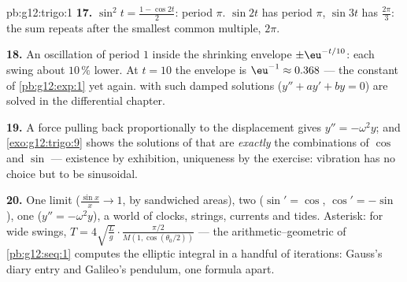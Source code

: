 \begin{solution}{pb:g12:trigo:1}
\textbf{17.} $\sin^2 t = \frac{1 - \cos 2t}{2}$: period
$\pi$. $\sin 2t$ has period $\pi$, $\sin 3t$ has
$\frac{2\pi}{3}$: the sum repeats after the smallest common
multiple, $2\pi$.

\textbf{18.} An oscillation of period $1$ inside the shrinking
envelope $\pm\eu^{-t/10}$: each swing about $10\,\%$ lower. At
$t = 10$ the envelope is $\eu^{-1} \approx 0.368$ --- the
constant of \cref{pb:g12:exp:1} yet again.  with such
damped solutions ($y'' + a y' + b y = 0$) are solved in the
differential  chapter.

\textbf{19.} A force pulling back proportionally to the
displacement gives $y'' = -\omega^2 y$; and
\cref{exo:g12:trigo:9} shows the solutions of that 
are \emph{exactly} the combinations of $\cos$ and $\sin$ ---
existence by exhibition, uniqueness by the exercise: vibration
has no choice but to be sinusoidal.

\textbf{20.} One limit ($\frac{\sin x}{x} \to 1$, by
sandwiched areas), two  ($\sin' = \cos$,
$\cos' = -\sin$), one  ($y'' = -\omega^2 y$), a world
of clocks, strings, currents and tides. Asterisk: for wide
swings, $T = 4\sqrt{\frac Lg} \cdot
\frac{\pi/2}{M(1, \cos(\theta_0/2))}$ --- the
arithmetic--geometric  of \cref{pb:g12:seq:1} computes the
elliptic integral in a handful of iterations: Gauss's diary
entry and Galileo's pendulum, one formula apart.
\end{solution}
